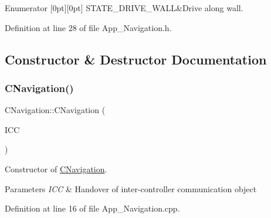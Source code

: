 \begin{DoxyEnumFields}{Enumerator}
[0pt][0pt]{}\mbox{\label{class_c_navigation_add9fc966c7604990edf5c2a2e0eba32caf1c06acfa5b7fed4fa82ed8ab9c42d10}} 
S\+T\+A\+T\+E\+\_\+\+D\+R\+I\+V\+E\+\_\+\+W\+A\+LL&Drive along wall. \\
\hline

\end{DoxyEnumFields}


Definition at line 28 of file App\+\_\+\+Navigation.\+h.



\subsection{Constructor \& Destructor Documentation}
\mbox{\label{class_c_navigation_a0527efabaf4644c8c4e7910efec36e82}} 
\subsubsection{\texorpdfstring{C\+Navigation()}{CNavigation()}}
{\footnotesize\ttfamily C\+Navigation\+::\+C\+Navigation (\begin{DoxyParamCaption}\item[{\mbox{\hyperlink{class_c_i_c_c_comms}{C\+I\+C\+C\+Comms}} \&}]{I\+CC }\end{DoxyParamCaption})}



Constructor of \mbox{\hyperlink{class_c_navigation}{C\+Navigation}}. 


\begin{DoxyParams}{Parameters}
{\em I\+CC} & Handover of inter-\/controller communication object \\
\hline
\end{DoxyParams}


Definition at line 16 of file App\+\_\+\+Navigation.\+cpp.

\mbox{\label{class_c_navigation_ae4c7c3e27ded45a94bc268634a7739da}} 

